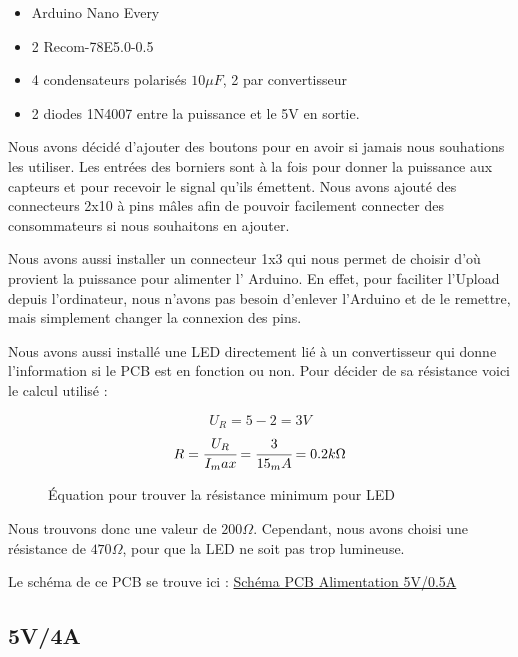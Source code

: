 \documentclass[
	a4paper,									%
	11pt,										%
	twoside,									%
	openright,									%
	notitlepage,									%
	parskip=half,								%
]{scrreprt}										%
\begin{document}
\begin{itemize}
	\item Arduino Nano Every
	\item 2 Recom-78E5.0-0.5
	\item 4 condensateurs polarisés $10\mu F$, 2 par convertisseur
	\item 2 diodes 1N4007 entre la puissance et le 5V en sortie.
\end{itemize}

Nous avons décidé d'ajouter des boutons pour en avoir si jamais nous souhations les utiliser. Les entrées des borniers
sont à la fois pour donner la puissance aux capteurs et pour recevoir le signal qu'ils émettent. Nous avons ajouté 
des connecteurs 2x10 à pins mâles afin de pouvoir facilement connecter des consommateurs si nous souhaitons en 
ajouter. \par

Nous avons aussi installer un connecteur 1x3 qui nous permet de choisir d'où provient la puissance pour alimenter l'
Arduino. En effet, pour faciliter l'Upload depuis l'ordinateur, nous n'avons pas besoin d'enlever l'Arduino et de le 
remettre, mais simplement changer la connexion des pins. \par

\newpage
Nous avons aussi installé une LED directement lié à un convertisseur qui donne l'information si le PCB est en 
fonction ou non. Pour décider de sa résistance voici le calcul utilisé : 

\begin{figure}[!h]

		\[U_R = 5-2 = 3V\]
		\[R = \cfrac{U_R}{I_max} = \cfrac{3}{15_mA} = 0.2k\Omega\] 
		\caption{Équation pour trouver la résistance minimum pour LED}
		\label{eq2}

\end{figure}

Nous trouvons donc une valeur de $200\Omega$. Cependant, nous avons choisi une résistance de $470\Omega$, pour que 
la LED ne soit pas trop lumineuse.

Le schéma de ce PCB se trouve ici : \href{run:./Schema_Alim_0.5.pdf}{Schéma PCB Alimentation 5V/0.5A}


\subsection{5V/4A}
\end{document}
